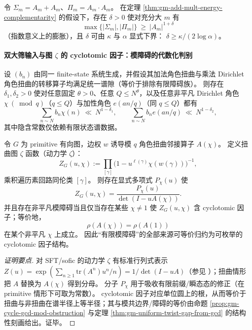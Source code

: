 \begin{corollary}\label{cor:gm-sumproduct-exponent-law}
令 \(\Sigma_m=A_m+A_m\)、\(\Pi_m=A_m\cdot A_m\)。
在定理 \ref{thm:gm-add-mult-energy-complementarity} 的假设下，存在 \(\delta>0\) 使对充分大 \(m\) 有
\[
\max\{|\Sigma_m|,|\Pi_m|\}\ \ge\ |A_m|^{1+\delta}
\]
（指数意义上的膨胀），且 \(\delta\) 可由 \(\kappa\) 与 \(\alpha\) 显式下界：
\(
\delta\ge \kappa/(2\log\alpha)
\)。
\end{corollary}

\paragraph{双大筛输入与图 \texorpdfstring{$\zeta$}{zeta} 的 cyclotomic 因子：模障碍的代数化判别}
\begin{proposition}\label{prop:gm-double-large-sieve-input}
设 \((b_n)\) 由同一 finite-state 系统生成，并假设其加法角色扭曲与乘法 Dirichlet 角色扭曲的转移算子均满足统一谱隙（等价于排除有限障碍族）。
则存在 \(\delta_1,\delta_2>0\) 使对任意固定 \(\theta>0\)、任意 \(Q\le N^\theta\)，以及任意非平凡 Dirichlet 角色 \(\chi\ (\bmod q)\)（\(q\le Q\)）与加性角色 \(e(an/q)\)（同 \(q\le Q\)）都有
\[
\sum_{n\sim N} b_n\chi(n)\ \ll\ N^{1-\delta_1},
\qquad
\sum_{n\sim N} b_n e(an/q)\ \ll\ N^{1-\delta_2},
\]
其中隐含常数仅依赖有限状态谱数据。
\end{proposition}

\begin{theorem}\label{thm:gm-graph-zeta-cyclotomic-classification}
令 \(G\) 为 primitive 有向图，边权 \(w\) 诱导模 \(q\) 角色扭曲邻接算子 \(A(\chi)\)。
定义扭曲图 \(\zeta\) 函数（动力学 \(\zeta\)）：
\[
Z_G(u,\chi):=\prod_{[\gamma]}\bigl(1-u^{\ell(\gamma)}\chi(w(\gamma))\bigr)^{-1},
\]
乘积遍历素回路同伦类 \([\gamma]\)。
则存在显式多项式 \(P_\chi(u)\) 使
\[
Z_G(u,\chi)=\frac{P_\chi(u)}{\det(I-uA(\chi))}.
\]
并且存在非平凡模障碍当且仅当存在某些 \(\chi\ne 1\) 使 \(Z_G(u,\chi)\) 含 cyclotomic 因子；等价地，
\[
\rho(A(\chi))=\rho(A(1))
\]
在某个非平凡 \(\chi\) 上成立。
因此“有限模障碍”的全部来源可等价归约为可枚举的 cyclotomic 因子结构。
\end{theorem}

\begin{proof}[证明要点]
对 SFT/sofic 的动力学 \(\zeta\) 有标准行列式表示 \(Z(u)=\exp(\sum_{n\ge 1}\mathrm{tr}(A^n)u^n/n)=1/\det(I-uA)\)（参见 \cite[Chapter~6]{LindMarcus1995}）；扭曲情形把 \(A\) 替换为 \(A(\chi)\) 得到分母。
分子 \(P_\chi\) 用于吸收有限前缀/瞬态态的修正（在 primitive 情形下可取为常数）。
cyclotomic 因子对应单位圆上的根，从而等价于扭曲与非扭曲在谱半径上等半径；其与模共边界/障碍的等价由命题 \ref{prop:gm-cycle-gcd-mod-obstruction} 与定理 \ref{thm:gm-uniform-twist-gap-from-gcd} 的结构性刻画给出。证毕。
\end{proof}

\endinput
